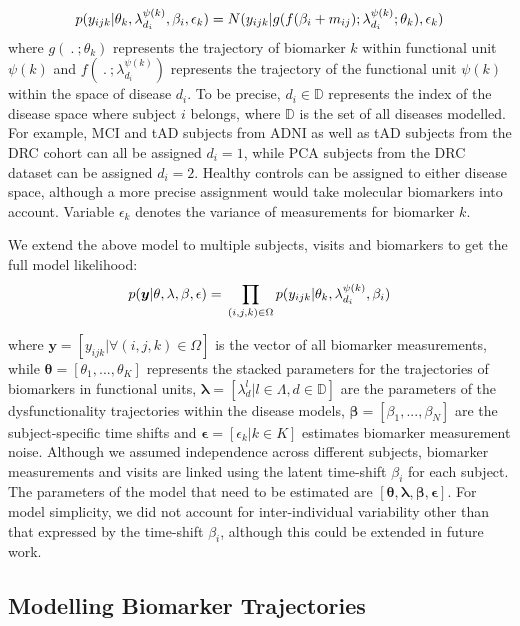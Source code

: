 \begin{equation}
 p(y_{ijk}|\theta_k, \lambda_{d_i}^{\psi(k)}, \beta_i, \epsilon_k) = N(y_{ijk}| g(f(\beta_i + m_{ij}); \lambda_{d_i}^{\psi(k)}; \theta_k), \epsilon_k)
\end{equation}
where $g(\ .\ ; \theta_k)$ represents the trajectory of biomarker $k$ within functional unit $\psi(k)$ and $f(\ .\ ; \lambda_{d_i}^{\psi(k)})$ represents the trajectory of the functional unit $\psi(k)$ within the space of disease $d_i$. To be precise, $d_i \in \mathbb{D}$ represents the index of the disease space where subject $i$ belongs, where $\mathbb{D}$ is the set of all diseases modelled. For example, MCI and tAD subjects from ADNI as well as tAD subjects from the DRC cohort can all be assigned $d_i=1$, while PCA subjects from the DRC dataset can be assigned $d_i=2$. Healthy controls can be assigned to either disease space, although a more precise assignment would take molecular biomarkers into account. Variable $\epsilon_k$ denotes the variance of measurements for biomarker $k$. 

We extend the above model to multiple subjects, visits and biomarkers to get the full model likelihood:
\begin{equation}
 p(\boldsymbol{y}|\theta, \lambda, \beta , \epsilon) = \\ \prod_{(i,j,k) \in \Omega} p(y_{ijk}|\theta_k, \lambda_{d_i}^{\psi(k)}, \beta_i) 
\end{equation}

where $\boldsymbol{y} = [y_{ijk} | \forall (i,j,k) \in \Omega ]$ is the vector of all biomarker measurements, while $\boldsymbol{\theta} = [\theta_1, ..., \theta_K]$ represents the stacked parameters for the trajectories of biomarkers in functional units, $\boldsymbol{\lambda} = [\lambda_d^{l}|l \in \Lambda, d \in \mathbb{D}]$ are the parameters of the dysfunctionality trajectories within the disease models, $\boldsymbol{\beta} =[\beta_1, ..., \beta_N]$ are the subject-specific time shifts and $\boldsymbol{\epsilon} = [\epsilon_k | k \in K]$  estimates biomarker measurement noise. Although we assumed independence across different subjects, biomarker measurements and visits are linked using the latent time-shift $\beta_i$ for each subject. The parameters of the model that need to be estimated are $[\boldsymbol{\theta}, \boldsymbol{\lambda}, \boldsymbol{\beta}, \boldsymbol{\epsilon}]$. For model simplicity, we did not account for inter-individual variability other than that expressed by the time-shift $\beta_i$, although this could be extended in future work.

\subsection{Modelling Biomarker Trajectories}
\label{sec:dktBiomkTraj}


